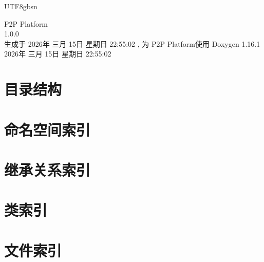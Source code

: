 \documentclass[twoside]{book}
\newcommand{\+}{\discretionary{\mbox{\scriptsize$\hookleftarrow$}}{}{}}
\newcommand{\clearemptydoublepage}{%
    \newpage{\pagestyle{empty}\cleardoublepage}%
  }
\begin{document}
  \raggedbottom
  \begin{CJK}{UTF8}{gbsn}
    \hypersetup{pageanchor=false,
                bookmarksnumbered=true,
                pdfencoding=unicode
               }
  \begin{titlepage}
  \vspace*{7cm}
  \begin{center}%
  {\Large P2\+P Platform}\\
  [1ex]\large 1.\+0.\+0 \\
  \vspace*{1cm}
  {\large 生成于 2026年 三月 15日 星期日 22:\+55:\+02 , 为 P2\+P Platform使用  Doxygen 1.16.1}\\
    \vspace*{0.5cm}
    {\small 2026年 三月 15日 星期日 22:55:02}
  \end{center}
  \end{titlepage}
  \clearemptydoublepage
  \tableofcontents
  \clearemptydoublepage
  \hypersetup{pageanchor=true}









\chapter{目录结构}

\chapter{命名空间索引}

\chapter{继承关系索引}

\chapter{类索引}

\chapter{文件索引}


\end{CJK}
\end{document}
